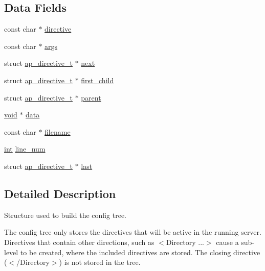 \subsection*{Data Fields}
\begin{DoxyCompactItemize}
\item 
const char $\ast$ \hyperlink{structap__directive__t_ae34ef98c8ee07242d69e20f54a6fbdae}{directive}
\item 
const char $\ast$ \hyperlink{structap__directive__t_ad15c07ad28925cabd3103b6ad3fe0a6f}{args}
\item 
struct \hyperlink{structap__directive__t}{ap\+\_\+directive\+\_\+t} $\ast$ \hyperlink{structap__directive__t_a0d106e8328ddc177654ff6770455f485}{next}
\item 
struct \hyperlink{structap__directive__t}{ap\+\_\+directive\+\_\+t} $\ast$ \hyperlink{structap__directive__t_acb47f52e698458241b560069f264b5e3}{first\+\_\+child}
\item 
struct \hyperlink{structap__directive__t}{ap\+\_\+directive\+\_\+t} $\ast$ \hyperlink{structap__directive__t_a2269b52ef32da6ee5116fb559df38fc7}{parent}
\item 
\hyperlink{group__MOD__ISAPI_gacd6cdbf73df3d9eed42fa493d9b621a6}{void} $\ast$ \hyperlink{structap__directive__t_a058fec74505034b91db4688d3eb544e6}{data}
\item 
const char $\ast$ \hyperlink{structap__directive__t_a39d11e553a29d211382db34ba04609ee}{filename}
\item 
\hyperlink{pcre_8txt_a42dfa4ff673c82d8efe7144098fbc198}{int} \hyperlink{structap__directive__t_a80fe1af1a12ee31f608a00d2150ca580}{line\+\_\+num}
\item 
struct \hyperlink{structap__directive__t}{ap\+\_\+directive\+\_\+t} $\ast$ \hyperlink{structap__directive__t_afe428d970b3cc7c70993edf916143df1}{last}
\end{DoxyCompactItemize}


\subsection{Detailed Description}
Structure used to build the config tree. 

The config tree only stores the directives that will be active in the running server. Directives that contain other directions, such as $<$Directory ...$>$ cause a sub-\/level to be created, where the included directives are stored. The closing directive ($<$/\+Directory$>$) is not stored in the tree. 

